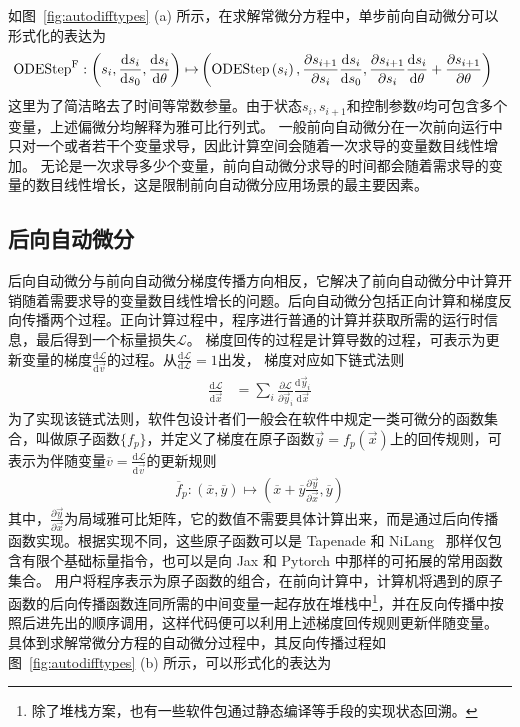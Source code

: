\documentclass[A4,twoside,UTF8]{ctexart}
\def\D{\mathrm{d}}
\begin{document}
如图~\ref{fig:autodifftypes} (a) 所示，在求解常微分方程中，单步前向自动微分可以形式化的表达为
\begin{align*}
    {\rm ODEStep}^{\rm F} : \left(s_{i}, \frac{\D s_{i}}{\D s_0}, \frac{\D s_{i}}{\D \theta}\right)
        \mapsto &\left({\rm ODEStep}\left(s_{i}\right), \frac{\partial s_{i+1}}{\partial s_i} \frac{\D s_{i}}{\D s_0},
        \frac{\partial s_{i+1}}{\partial s_i} \frac{\D s_{i}}{\D \theta} + \frac{\partial s_{i+1}}{\partial \theta}\right)
\end{align*}
这里为了简洁略去了时间等常数参量。由于状态$s_i, s_{i+1}$和控制参数$\theta$均可包含多个变量，上述偏微分均解释为雅可比行列式。
一般前向自动微分在一次前向运行中只对一个或者若干个变量求导，因此计算空间会随着一次求导的变量数目线性增加。
无论是一次求导多少个变量，前向自动微分求导的时间都会随着需求导的变量的数目线性增长，这是限制前向自动微分应用场景的最主要因素。

\subsection{后向自动微分}
后向自动微分与前向自动微分梯度传播方向相反，它解决了前向自动微分中计算开销随着需要求导的变量数目线性增长的问题。后向自动微分包括正向计算和梯度反向传播两个过程。正向计算过程中，程序进行普通的计算并获取所需的运行时信息，最后得到一个标量损失$\mathcal{L}$。
梯度回传的过程是计算导数的过程，可表示为更新变量的梯度$\frac{\D \mathcal{L}}{\D \vec v}$的过程。从$\frac{\D\mathcal L}{\D\mathcal L} = 1$出发，
梯度对应如下链式法则
\begin{align*}
    \frac{\D \mathcal{L}}{\D \vec x} &= \sum_{i}\frac{\partial \mathcal{L}}{\partial \vec y_i}\frac{\D \vec y_i}{\D \vec x}
\end{align*}
为了实现该链式法则，软件包设计者们一般会在软件中规定一类可微分的函数集合，叫做原子函数$\{f_p\}$，并定义了梯度在原子函数$\vec y=f_p(\vec x)$上的回传规则，可表示为伴随变量$\overline{v} = \frac{\D \mathcal{L}}{\D \vec v}$的更新规则
\begin{align*}
    \overline f_p: (\overline x, \overline y) \mapsto (\overline x + \overline y\frac{\partial \vec y}{\partial \vec x}, \overline y)
\end{align*}
其中，$\frac{\partial \vec y}{\partial \vec x}$为局域雅可比矩阵，它的数值不需要具体计算出来，而是通过后向传播函数实现。根据实现不同，这些原子函数可以是 Tapenade 和 NiLang~\cite{Liu2020b} 那样仅包含有限个基础标量指令，也可以是向 Jax 和 Pytorch 中那样的可拓展的常用函数集合。
用户将程序表示为原子函数的组合，在前向计算中，计算机将遇到的原子函数的后向传播函数连同所需的中间变量一起存放在堆栈中\footnote{除了堆栈方案，也有一些软件包通过静态编译等手段的实现状态回溯。}，并在反向传播中按照后进先出的顺序调用，这样代码便可以利用上述梯度回传规则更新伴随变量。
具体到求解常微分方程的自动微分过程中，其反向传播过程如图~\ref{fig:autodifftypes} (b) 所示，可以形式化的表达为
\end{document}
